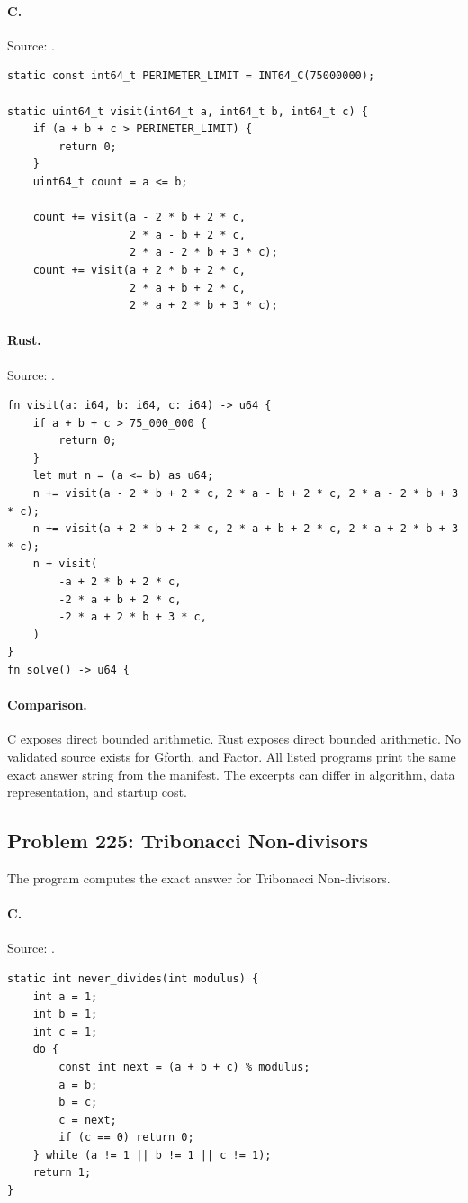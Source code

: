 \paragraph{C.} Source: .
\begin{lstlisting}
static const int64_t PERIMETER_LIMIT = INT64_C(75000000);

static uint64_t visit(int64_t a, int64_t b, int64_t c) {
    if (a + b + c > PERIMETER_LIMIT) {
        return 0;
    }
    uint64_t count = a <= b;

    count += visit(a - 2 * b + 2 * c,
                   2 * a - b + 2 * c,
                   2 * a - 2 * b + 3 * c);
    count += visit(a + 2 * b + 2 * c,
                   2 * a + b + 2 * c,
                   2 * a + 2 * b + 3 * c);
\end{lstlisting}

\paragraph{Rust.} Source: .
\begin{lstlisting}
fn visit(a: i64, b: i64, c: i64) -> u64 {
    if a + b + c > 75_000_000 {
        return 0;
    }
    let mut n = (a <= b) as u64;
    n += visit(a - 2 * b + 2 * c, 2 * a - b + 2 * c, 2 * a - 2 * b + 3 * c);
    n += visit(a + 2 * b + 2 * c, 2 * a + b + 2 * c, 2 * a + 2 * b + 3 * c);
    n + visit(
        -a + 2 * b + 2 * c,
        -2 * a + b + 2 * c,
        -2 * a + 2 * b + 3 * c,
    )
}
fn solve() -> u64 {
\end{lstlisting}

\paragraph{Comparison.}
C exposes direct bounded arithmetic. Rust exposes direct bounded arithmetic.
No validated source exists for Gforth, and Factor.
All listed programs print the same exact answer string from the manifest. The excerpts can differ in algorithm, data representation, and startup cost.

\subsection{Problem 225: Tribonacci Non-divisors}
\label{walkthrough:p225}
The program computes the exact answer for Tribonacci Non-divisors.

\paragraph{C.} Source: .
\begin{lstlisting}
static int never_divides(int modulus) {
    int a = 1;
    int b = 1;
    int c = 1;
    do {
        const int next = (a + b + c) % modulus;
        a = b;
        b = c;
        c = next;
        if (c == 0) return 0;
    } while (a != 1 || b != 1 || c != 1);
    return 1;
}
\end{lstlisting}

